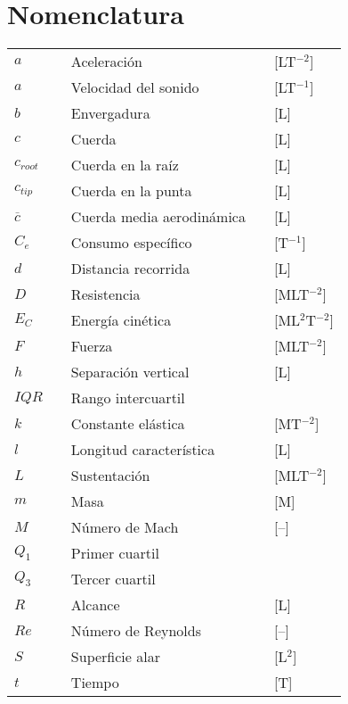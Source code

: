 \section*{Nomenclatura}
\label{sec:nomenclatura}

\begin{longtable*}{p{20mm} c p{80mm} c p{40mm} }
$a$ 			&& Aceleración                  && [LT$^{-2}$]\\
$a$ 			&& Velocidad del sonido         && [LT$^{-1}$]\\
$b$ 			&& Envergadura                  && [L]\\
$c$	            && Cuerda                       && [L]\\
$c_{root}$	    && Cuerda en la raíz            && [L]\\
$c_{tip}$	    && Cuerda en la punta           && [L]\\
$\overline{c}$	&& Cuerda media aerodinámica    && [L]\\
$C_e$ 			&& Consumo específico           && [T$^{-1}$]\\
$d$ 			&& Distancia recorrida          && [L]\\
$D$ 			&& Resistencia                  && [MLT$^{-2}$]\\
$E_C$ 			&& Energía cinética             && [ML$^2$T$^{-2}$]\\
$F$ 			&& Fuerza                       && [MLT$^{-2}$]\\
$h$ 			&& Separación vertical          && [L]\\
$IQR$ 			&& Rango intercuartil           && \\
$k$ 			&& Constante elástica           && [MT$^{-2}$]\\
$l$ 			&& Longitud característica      && [L]\\
$L$ 			&& Sustentación                 && [MLT$^{-2}$]\\
$m$ 			&& Masa                         && [M]\\
$M$ 			&& Número de Mach               && [–]\\
$Q_1$ 			&& Primer cuartil               && \\
$Q_3$ 			&& Tercer cuartil               && \\
$R$ 			&& Alcance                      && [L]\\
$Re$ 			&& Número de Reynolds           && [–]\\
$S$ 			&& Superficie alar              && [L$^2$]\\
$t$ 			&& Tiempo                       && [T]\\

\end{longtable*}
